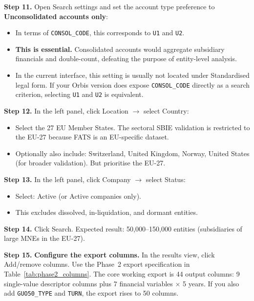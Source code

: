 \documentclass[11pt,a4paper]{article}
\newcommand{\field}[1]{\texttt{#1}}
\newcommand{\menu}[1]{\textsf{#1}}
\newcommand{\step}[1]{\noindent\textbf{Step #1.}\quad}
\begin{document}
\step{11} Open \menu{Search settings} and set the account type preference to \textbf{Unconsolidated accounts only}:
\begin{itemize}[noitemsep]
  \item In terms of \field{CONSOL\_CODE}, this corresponds to \field{U1} and \field{U2}.
  \item \textbf{This is essential.} Consolidated accounts would aggregate subsidiary financials and double-count, defeating the purpose of entity-level analysis.
  \item In the current interface, this setting is usually not located under \menu{Standardised legal form}. If your Orbis version does expose \field{CONSOL\_CODE} directly as a search criterion, selecting \field{U1} and \field{U2} is equivalent.
\end{itemize}

\step{12} In the left panel, click \menu{Location} $\to$ select \menu{Country}:
\begin{itemize}[noitemsep]
  \item Select the 27 EU Member States. The sectoral SBIE validation is restricted to the EU-27 because FATS is an EU-specific dataset.
  \item Optionally also include: Switzerland, United Kingdom, Norway, United States (for broader validation). But prioritise the EU-27.
\end{itemize}

\step{13} In the left panel, click \menu{Company} $\to$ select \menu{Status}:
\begin{itemize}[noitemsep]
  \item Select: \menu{Active} (or \menu{Active companies only}).
  \item This excludes dissolved, in-liquidation, and dormant entities.
\end{itemize}

\step{14} Click \menu{Search}. Expected result: 50,000--150,000 entities (subsidiaries of large MNEs in the EU-27).

\step{15} \textbf{Configure the export columns.} In the results view, click \menu{Add/remove columns}. Use the Phase~2 export specification in Table~\ref{tab:phase2_columns}. The core working export is 44 output columns: 9 single-value descriptor columns plus 7 financial variables $\times$ 5 years. If you also add \field{GUO50\_TYPE} and \field{TURN}, the export rises to 50 columns.
\end{document}
